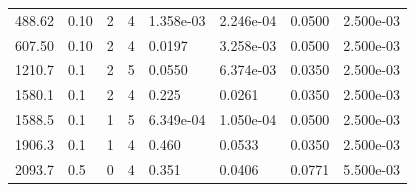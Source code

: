 \documentclass[preview]{standalone}
\begin{document}
{{\begin{tabular}{L{1.2cm}C{1.2cm} C{0.3cm}C{0.5cm} C{1.4cm}C{1.4cm} C{1.4cm}C{1.4cm}}
  488.62  &  0.10  & 2     &  4 &  1.358e-03  & 2.246e-04  & 0.0500 &  2.500e-03   \\ 
  607.50  &  0.10  & 2     &  4 &  0.0197  & 3.258e-03  & 0.0500 &  2.500e-03   \\ 
  1210.7  &   0.1  & 2     &  5 &  0.0550  & 6.374e-03  & 0.0350 &  2.500e-03   \\ 
  1580.1  &   0.1  & 2     &  4 &  0.225  & 0.0261  & 0.0350 &  2.500e-03   \\ 
  1588.5  &   0.1  & 1     &  5 &  6.349e-04  & 1.050e-04  & 0.0500 &  2.500e-03   \\ 
  1906.3  &   0.1  & 1     &  4 &  0.460  & 0.0533  & 0.0350 &  2.500e-03   \\ 
  2093.7  &   0.5  & 0     &  4 &  0.351  & 0.0406  & 0.0771 &  5.500e-03   \\ 
\hline 
\end{tabular} 

}}
\end{document}
